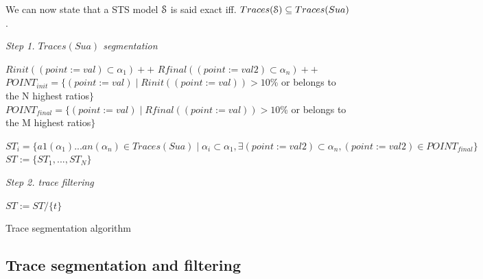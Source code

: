 We can now state that a  STS model $\EuScript{S}$ is said exact
iff. $Traces(\EuScript{S}) \subseteq Traces(Sua)$.

\begin{algorithm}


\BlankLine
\emph{Step 1. $Traces(Sua)$ segmentation}

 {
$Rinit((point:=val)\subset \alpha_1)++$\;
$Rfinal((point:=val2)\subset \alpha_n)++$\;
}
$POINT_{init}=\{(point:=val) \mid Rinit((point:=val))>10$\% or belongs to the N highest ratios$\}$\;
$POINT_{final}=\{(point:=val) \mid Rfinal((point:=val))>10$\% or belongs to the M highest ratios$\}$\;
\BlankLine

 {
	$ST_i=\{a1(\alpha_1)...an(\alpha_n)\in Traces(Sua) \mid \alpha_i\subset \alpha_1, \exists (point:=val2)\subset \alpha_n, (point:=val2)\in POINT_{final}    \}$\;
}
$ST:=\{ST_1,...,ST_N\}$\;

\BlankLine
\emph{Step 2. trace filtering}

 {
	{
		$ST:= ST/ \{  t \}$\;
	}


	}

    \caption{Trace segmentation algorithm}
	\label{algo_traces}
\end{algorithm}

\subsection{Trace segmentation and filtering}

